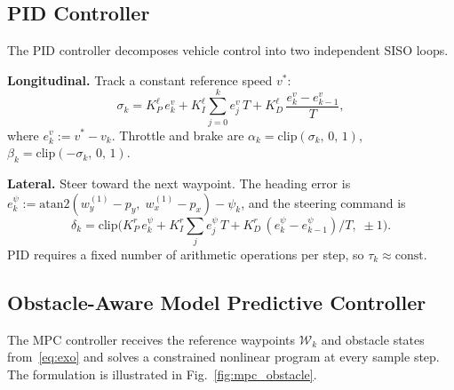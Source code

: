 \documentclass[conference]{IEEEtran}
\newcommand{\calW}{\mathcal{W}}
\begin{document}
\subsection{PID Controller}\label{sec:pid}

The PID controller decomposes vehicle control into two independent
SISO loops.

\noindent\textbf{Longitudinal.}  Track a constant reference speed
$v^*$:
\begin{equation}\label{eq:pid_lon}
  \sigma_k = K_P^\ell\, e_k^v + K_I^\ell \sum_{j=0}^{k} e_j^v\, T
    + K_D^\ell\, \frac{e_k^v - e_{k-1}^v}{T},
\end{equation}
where $e_k^v := v^* - v_k$.  Throttle and brake are
$\alpha_k = \mathrm{clip}(\sigma_k,\, 0,\, 1)$,\;
$\beta_k = \mathrm{clip}(-\sigma_k,\, 0,\, 1)$.

\noindent\textbf{Lateral.}  Steer toward the next waypoint.
The heading error is
$e_k^\psi := \mathrm{atan2}(w_y^{(1)} - p_y,\; w_x^{(1)} - p_x) - \psi_k$,
and the steering command is
\begin{equation}\label{eq:pid_lat}
  \delta_k = \mathrm{clip}\!\bigl(K_P^r\, e_k^\psi + K_I^r
    \textstyle\sum_j e_j^\psi\, T + K_D^r\,
    (e_k^\psi - e_{k-1}^\psi)/T,\;\pm 1\bigr).
\end{equation}
PID requires a fixed number of arithmetic operations per step,
so $\tau_k \approx \mathrm{const}$.

\subsection{Obstacle-Aware Model Predictive Controller}\label{sec:mpc}

The MPC controller receives the reference waypoints
$\calW_k$ and obstacle states from~\eqref{eq:exo} and solves a
constrained nonlinear program at every sample step.
The formulation is illustrated in
Fig.~\ref{fig:mpc_obstacle}.
\end{document}

